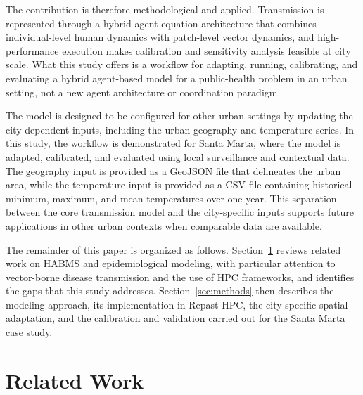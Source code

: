 \documentclass[applsci,article,accept,pdftex,moreauthors]{Definitions/mdpi}
\begin{document}
The contribution is therefore methodological and applied. Transmission is represented through a hybrid agent-equation architecture that combines individual-level human dynamics with patch-level vector dynamics, and high-performance execution makes calibration and sensitivity analysis feasible at city scale. What this study offers is a workflow for adapting, running, calibrating, and evaluating a hybrid agent-based model for a public-health problem in an urban setting, not a new agent architecture or coordination paradigm.

The model is designed to be configured for other urban settings by updating the city-dependent inputs, including the urban geography and temperature series. In this study, the workflow is demonstrated for Santa Marta, where the model is adapted, calibrated, and evaluated using local surveillance and contextual data. The geography input is provided as a GeoJSON file that delineates the urban area, while the temperature input is provided as a CSV file containing historical minimum, maximum, and mean temperatures over one year. This separation between the core transmission model and the city-specific inputs supports future applications in other urban contexts when comparable data are available.

The remainder of this paper is organized as follows. Section~\ref{sec:relatedwork} reviews related work on HABMS and epidemiological modeling, with particular attention to vector-borne disease transmission and the use of HPC frameworks, and identifies the gaps that this study addresses. Section~\ref{sec:methods} then describes the modeling approach, its implementation in Repast HPC, the city-specific spatial adaptation, and the calibration and validation carried out for the Santa Marta case study.
\section{Related Work}
\label{sec:relatedwork}
\end{document}
